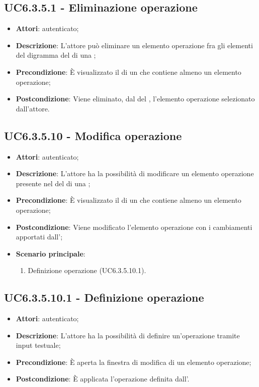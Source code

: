 \subsection{UC6.3.5.1 - Eliminazione operazione}
\label{ssec:UC6.3.5.1}
\begin{itemize}
\item \textbf{Attori}:  autenticato;
\item \textbf{Descrizione}: L'attore può eliminare un elemento operazione fra gli elementi del digramma del  di una ;
\item \textbf{Precondizione}: È visualizzato il  di un  che contiene almeno un elemento operazione;
\item \textbf{Postcondizione}: Viene eliminato, dal  del ,  l'elemento operazione selezionato dall'attore.
\end{itemize}
\subsection{UC6.3.5.10 - Modifica operazione}
\label{ssec:UC6.3.5.10}
\begin{itemize}
\item \textbf{Attori}:  autenticato;
\item \textbf{Descrizione}: L'attore ha la possibilità di modificare un elemento operazione presente nel  del  di una ;
\item \textbf{Precondizione}: È visualizzato il  di un  che contiene almeno un elemento operazione;
\item \textbf{Postcondizione}: Viene modificato l'elemento operazione con i cambiamenti apportati dall';
\item \textbf{Scenario principale}: \begin{enumerate}\item Definizione operazione (UC6.3.5.10.1).
 \end{enumerate}
\end{itemize}
\subsection{UC6.3.5.10.1 - Definizione operazione}
\label{ssec:UC6.3.5.10.1}
\begin{itemize}
\item \textbf{Attori}:  autenticato;
\item \textbf{Descrizione}: L'attore ha la possibilità di definire un'operazione tramite input testuale;
\item \textbf{Precondizione}: È aperta la finestra di modifica di un elemento operazione;
\item \textbf{Postcondizione}: È applicata l'operazione definita dall'.
\end{itemize}

